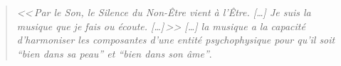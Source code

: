 

\begin{quotation}
\emph{<<\,\emph{Par le Son, le Silence du Non-Être vient à l'Être}. [\dots]
\textsl{Je suis}
	\emph{la musique que je fais ou écoute}. [\dots]\,>>
[\ldots] \emph{la musique a la capacité d'harmoniser
les composantes d'une entité psychophysique pour qu'il soit ``bien
dans sa peau'' et ``bien dans son âme}''}.\, \autocite[8]{viret:b}
\end{quotation}






%











